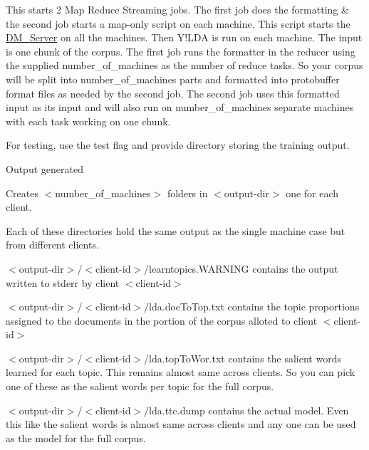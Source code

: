 \begin{DoxyEnumerate}
\begin{DoxyEnumerate}
\begin{DoxyEnumerate}
This starts 2 Map Reduce Streaming jobs. The first job does the formatting \& the second job starts a map-\/only script on each machine. This script starts the \hyperlink{class_d_m___server}{DM\_\-Server} on all the machines. Then Y!LDA is run on each machine. The input is one chunk of the corpus. The first job runs the formatter in the reducer using the supplied number\_\-of\_\-machines as the number of reduce tasks. So your corpus will be split into number\_\-of\_\-machines parts and formatted into protobuffer format files as needed by the second job. The second job uses this formatted input as its input and will also run on number\_\-of\_\-machines separate machines with each task working on one chunk. 
\item 

For testing, use the test flag and provide directory storing the training output. 
\end{DoxyEnumerate}
\item 

Output generated 
\begin{DoxyEnumerate}
\item 

Creates $<$number\_\-of\_\-machines$>$ folders in $<$output-\/dir$>$ one for each client.  
\item 

Each of these directories hold the same output as the single machine case but from different clients.  
\item 

$<$output-\/dir$>$/$<$client-\/id$>$/learntopics.WARNING contains the output written to stderr by client $<$client-\/id$>$ 
\item 

$<$output-\/dir$>$/$<$client-\/id$>$/lda.docToTop.txt contains the topic proportions assigned to the documents in the portion of the corpus alloted to client $<$client-\/id$>$ 
\item 

$<$output-\/dir$>$/$<$client-\/id$>$/lda.topToWor.txt contains the salient words learned for each topic. This remains almost same across clients. So you can pick one of these as the salient words per topic for the full corpus. 
\item 

$<$output-\/dir$>$/$<$client-\/id$>$/lda.ttc.dump contains the actual model. Even this like the salient words is almost same across clients and any one can be used as the model for the full corpus. 
\item 


\end{DoxyEnumerate}
\end{DoxyEnumerate}
\end{DoxyEnumerate}
